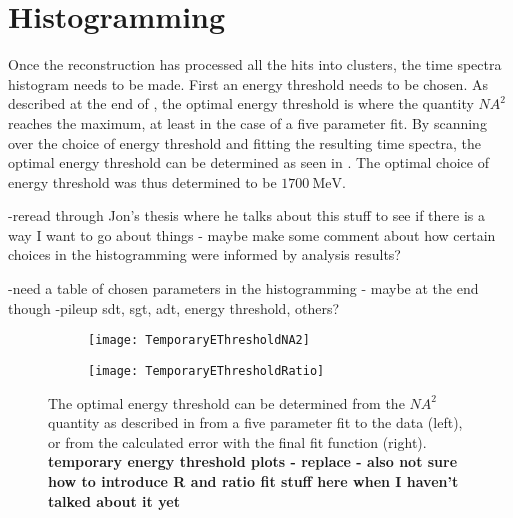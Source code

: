 \section{Histogramming}
\label{sec:Histogramming}


Once the reconstruction has processed all the hits into clusters, the time spectra histogram needs to be made. First an energy threshold needs to be chosen. As described at the end of , the optimal energy threshold is where the quantity $NA^{2}$ reaches the maximum, at least in the case of a five parameter fit. By scanning over the choice of energy threshold and fitting the resulting time spectra, the optimal energy threshold can be determined as seen in . The optimal choice of energy threshold was thus determined to be $\SI{1700}{\MeV}$.




-reread through Jon's thesis where he talks about this stuff to see if there is a way I want to go about things
- maybe make some comment about how certain choices in the histogramming were informed by analysis results?


-need a table of chosen parameters in the histogramming - maybe at the end though
-pileup sdt, sgt, adt, energy threshold, others?


    \begin{figure}[]
    \centering
        \begin{subfigure}[t]{0.45\textwidth}
            \centering
            \texttt{[image: TemporaryEThresholdNA2]}
            \caption{}
        \end{subfigure}
        \begin{subfigure}[t]{0.45\textwidth}
            \centering
            \texttt{[image: TemporaryEThresholdRatio]}
            \caption{}
        \end{subfigure}%
    \caption[Determination of optimal energy threshold]{The optimal energy threshold can be determined from the $NA^{2}$ quantity as described in  from a five parameter fit to the data (left), or from the calculated error with the final fit function (right). \textbf{temporary energy threshold plots - replace - also not sure how to introduce R and ratio fit stuff here when I haven't talked about it yet}}
    \label{fig:OptimalEnergyThreshold}
    \end{figure}






